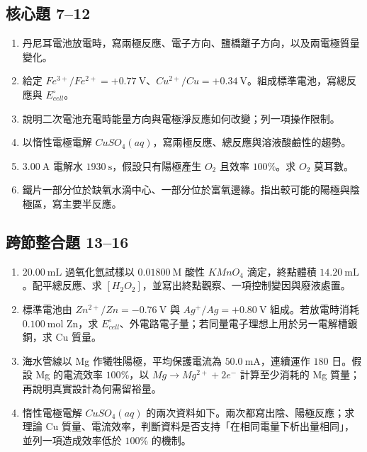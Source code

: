 \documentclass[11pt,a4paper]{article}
\providecommand{\tightlist}{%
  \setlength{\itemsep}{0pt}\setlength{\parskip}{0pt}}
\begin{document}
\subsection{核心題 7--12}\label{ux6838ux5fc3ux984c-712}

\begin{enumerate}
\def\labelenumi{\arabic{enumi}.}
\setcounter{enumi}{6}
\tightlist
\item
  丹尼耳電池放電時，寫兩極反應、電子方向、鹽橋離子方向，以及兩電極質量變化。
\item
  給定 \(Fe^{3+}/Fe^{2+}=+0.77\ \mathrm V\)、\(Cu^{2+}/Cu=+0.34\ \mathrm V\)。組成標準電池，寫總反應與 \(E^\circ_{cell}\)。
\item
  說明二次電池充電時能量方向與電極淨反應如何改變；列一項操作限制。
\item
  以惰性電極電解 \(CuSO_4(aq)\)，寫兩極反應、總反應與溶液酸鹼性的趨勢。
\item
  \(3.00\ \mathrm A\) 電解水 \(1930\ \mathrm s\)，假設只有陽極產生 \(O_2\) 且效率 \(100\%\)。求 \(O_2\) 莫耳數。
\item
  鐵片一部分位於缺氧水滴中心、一部分位於富氧邊緣。指出較可能的陽極與陰極區，寫主要半反應。
\end{enumerate}

\subsection{跨節整合題 13--16}\label{ux8de8ux7bc0ux6574ux5408ux984c-1316}

\begin{enumerate}
\def\labelenumi{\arabic{enumi}.}
\setcounter{enumi}{12}
\tightlist
\item
  \(20.00\ \mathrm{mL}\) 過氧化氫試樣以 \(0.01800\ \mathrm M\) 酸性 \(KMnO_4\) 滴定，終點體積 \(14.20\ \mathrm{mL}\)。配平總反應、求 \([H_2O_2]\)，並寫出終點觀察、一項控制變因與廢液處置。
\item
  標準電池由 \(Zn^{2+}/Zn=-0.76\ \mathrm V\) 與 \(Ag^+/Ag=+0.80\ \mathrm V\) 組成。若放電時消耗 \(0.100\ \mathrm{mol}\) Zn，求 \(E^\circ_{cell}\)、外電路電子量；若同量電子理想上用於另一電解槽鍍銅，求 Cu 質量。
\item
  海水管線以 Mg 作犧牲陽極，平均保護電流為 \(50.0\ \mathrm{mA}\)，連續運作 \(180\) 日。假設 Mg 的電流效率 \(100\%\)，以 \(Mg\rightarrow Mg^{2+}+2e^-\) 計算至少消耗的 Mg 質量；再說明真實設計為何需留裕量。
\item
  惰性電極電解 \(CuSO_4(aq)\) 的兩次資料如下。兩次都寫出陰、陽極反應；求理論 Cu 質量、電流效率，判斷資料是否支持「在相同電量下析出量相同」，並列一項造成效率低於 \(100\%\) 的機制。
\end{enumerate}
\end{document}
